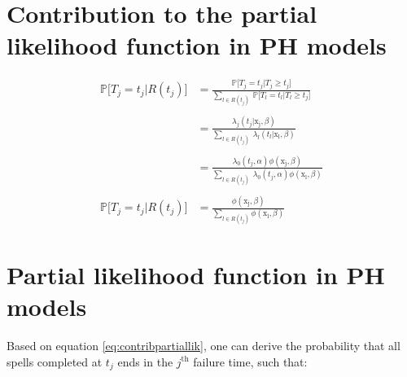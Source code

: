 \documentclass[
]{book}
\begin{document}
\hypertarget{contribution-to-the-partial-likelihood-function-in-ph-models}{%
\section*{Contribution to the partial likelihood function in PH models}\label{contribution-to-the-partial-likelihood-function-in-ph-models}}

\begin{equation}
\begin{aligned}
  \mathbb{P}\big[T_j = t_j | R(t_j) \big] & = \frac{\mathbb{P}\big[T_j = t_j | T_j \geq t_j \big]}{\sum_{l \in R(t_j)} \ \mathbb{P}\big[T_l = t_l | T_l \geq t_j \big]} \\\\
  & = \frac{\lambda_j(t_j|\mathrm{x_j}, \beta)}{\sum_{l \in R(t_j)} \ \lambda_l(t_l|\mathrm{x_l}, \beta)} \\\\
  & = \frac{\lambda_0 (t_j, \alpha)\phi(\mathrm{x_j}, \beta)}{\sum_{l \in R(t_j)} \ \lambda_0 (t_j, \alpha)\phi(\mathrm{x_l}, \beta)} \\\\
  \mathbb{P}\big[T_j = t_j | R(t_j) \big] & = \frac{\phi(\mathrm{x_j}, \beta)}{\sum_{l \in R(t_j)} \phi(\mathrm{x_l}, \beta)}
\end{aligned}
\label{eq:contribpartiallikproof}
\end{equation}

\hypertarget{partial-likelihood-function-in-ph-models}{%
\section*{Partial likelihood function in PH models}\label{partial-likelihood-function-in-ph-models}}

Based on equation \eqref{eq:contribpartiallik}, one can derive the probability that all spells completed at \(t_j\) ends in the \(j^{\text{th}}\) failure time, such that:
\end{document}
